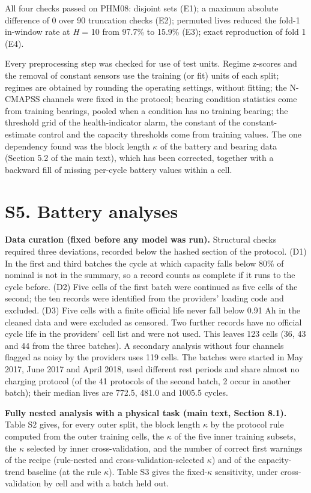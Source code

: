 \documentclass[11pt,a4paper]{article}
\begin{document}
\noindent All four checks passed on PHM08: disjoint sets (E1); a maximum absolute difference of 0 over 90 truncation checks (E2); permuted lives reduced the fold-1 in-window rate at \textit{H} = 10 from 97.7\% to 15.9\% (E3); exact reproduction of fold 1 (E4).

\noindent Every preprocessing step was checked for use of test units. Regime z-scores and the removal of constant sensors use the training (or fit) units of each split; regimes are obtained by rounding the operating settings, without fitting; the N-CMAPSS channels were fixed in the protocol; bearing condition statistics come from training bearings, pooled when a condition has no training bearing; the threshold grid of the health-indicator alarm, the constant of the constant-estimate control and the capacity thresholds come from training values. The one dependency found was the block length $\kappa$ of the battery and bearing data (Section 5.2 of the main text), which has been corrected, together with a backward fill of missing per-cycle battery values within a cell.

\section*{S5. Battery analyses}

\noindent \textbf{Data curation (fixed before any model was run).} Structural checks required three deviations, recorded below the hashed section of the protocol. (D1) In the first and third batches the cycle at which capacity falls below 80\% of nominal is not in the summary, so a record counts as complete if it runs to the cycle before. (D2) Five cells of the first batch were continued as five cells of the second; the ten records were identified from the providers' loading code and excluded. (D3) Five cells with a finite official life never fall below 0.91 Ah in the cleaned data and were excluded as censored. Two further records have no official cycle life in the providers' cell list and were not used. This leaves 123 cells (36, 43 and 44 from the three batches). A secondary analysis without four channels flagged as noisy by the providers uses 119 cells. The batches were started in May 2017, June 2017 and April 2018, used different rest periods and share almost no charging protocol (of the 41 protocols of the second batch, 2 occur in another batch); their median lives are 772.5, 481.0 and 1005.5 cycles.

\noindent \textbf{Fully nested analysis with a physical task (main text, Section 8.1).} Table S2 gives, for every outer split, the block length $\kappa$ by the protocol rule computed from the outer training cells, the $\kappa$ of the five inner training subsets, the $\kappa$ selected by inner cross-validation, and the number of correct first warnings of the recipe (rule-nested and cross-validation-selected $\kappa$) and of the capacity-trend baseline (at the rule $\kappa$). Table S3 gives the fixed-$\kappa$ sensitivity, under cross-validation by cell and with a batch held out.
\end{document}
